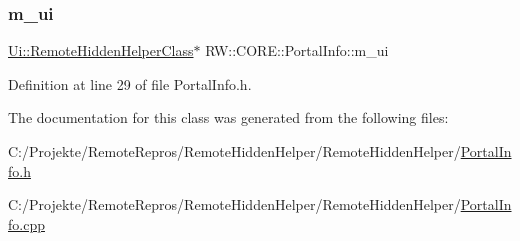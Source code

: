 \subsubsection{\texorpdfstring{m\+\_\+ui}{m\_ui}}
{\footnotesize\ttfamily \hyperlink{class_ui_1_1_remote_hidden_helper_class}{Ui\+::\+Remote\+Hidden\+Helper\+Class}$\ast$ R\+W\+::\+C\+O\+R\+E\+::\+Portal\+Info\+::m\+\_\+ui\hspace{0.3cm}{\ttfamily [private]}}



Definition at line 29 of file Portal\+Info.\+h.



The documentation for this class was generated from the following files\+:\begin{DoxyCompactItemize}
\item 
C\+:/\+Projekte/\+Remote\+Repros/\+Remote\+Hidden\+Helper/\+Remote\+Hidden\+Helper/\hyperlink{_portal_info_8h}{Portal\+Info.\+h}\item 
C\+:/\+Projekte/\+Remote\+Repros/\+Remote\+Hidden\+Helper/\+Remote\+Hidden\+Helper/\hyperlink{_portal_info_8cpp}{Portal\+Info.\+cpp}\end{DoxyCompactItemize}
